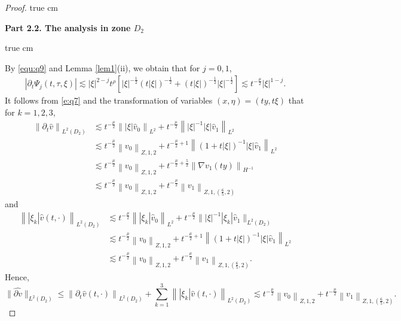 \documentclass[11pt,twoside]{article}
\newcommand{\p}{\partial}
\newcommand{\f}{\frac}
\theoremstyle{plain}
\theoremstyle{definition}
\theoremstyle{remark}
\numberwithin{equation}{section}
\begin{document}
\begin{proof}
 true cm

{\bf Part 2.2.  The analysis  in zone $D_2$}

 true cm

By  \eqref{equ:q9} and Lemma \ref{lem1}(ii), we obtain that for $j=0,1$,
\begin{equation}\label{e:q17}
\begin{aligned}
|\p_t\Psi_j(t,\tau,\xi)|
\lesssim |\xi|^{2-j} t^{\rho}\left[|\xi|^{-\f12}(t|\xi|)^{-\f12}+(t|\xi|)^{-\f12}|\xi|^{-\f12}\right]\lesssim t^{-\f{\mu}{2}}|\xi|^{1-j}.
\end{aligned}
\end{equation}
It follows from \eqref{e:q7} and the transformation of variables $(x, \eta)=(ty, t\xi)$  that for $k=1, 2, 3$,
\begin{equation}\label{e:q18}
\begin{aligned}
\left\|\p_t\hat{v}\right\|_{L^2(D_2)} & \lesssim  t^{-\f{\mu}{2}}\left\||\xi|\hat{v}_{0}\right\|_{L^{2}}+t^{-\f{\mu}{2}}\left\||\xi|^{-1}|\xi|\hat{v}_{1}\right\|_{L^{2}} \\
& \lesssim  t^{-\f{\mu}{2}}\left\|v_{0}\right\|_{Z, 1, 2}+t^{-\f{\mu}{2}+1}\left\|(1+t|\xi|)^{-1}|\xi|\hat{v}_{1}\right\|_{L^{2}} \\
& \lesssim  t^{-\f{\mu}{2}}\left\|v_{0}\right\|_{Z, 1, 2}+t^{-\f{\mu}{2}+\f52}\left\|\nabla v_{1}(ty)\right\|_{H^{-1}} \\
& \lesssim  t^{-\f{\mu}{2}}\left\|v_{0}\right\|_{Z, 1, 2}+t^{-\f{\mu}{2}}\left\| v_{1}\right\|_{Z, 1, (\f65, 2)}
\end{aligned}
\end{equation}
and
\begin{equation}\label{e:q19}
\begin{aligned}
\left\||\xi_k|\hat{v}(t, \cdot)\right\|_{L^2(D_2)}&\lesssim t^{-\frac{\mu}{2}}\left\||\xi_k|\hat{v}_{0}\right\|_{L^{2}}+t^{-\f{\mu}{2}} \||\xi|^{-1}|\xi_k|\hat{v}_{1}\|_{L^{2}(D_2)}\\
& \lesssim  t^{-\f{\mu}{2}}\left\|v_{0}\right\|_{Z, 1, 2}+t^{-\f{\mu}{2}+1}\left\|(1+t|\xi|)^{-1}|\xi|\hat{v}_{1}\right\|_{L^{2}} \\
& \lesssim  t^{-\f{\mu}{2}}\left\|v_{0}\right\|_{Z, 1, 2}+t^{-\f{\mu}{2}}\left\| v_{1}\right\|_{Z, 1, (\f65, 2)}.
\end{aligned}
\end{equation}
Hence,
\begin{equation}\label{e:q20}
\|\widehat{\p v}\|_{L^2(D_2)} \leq \left\|\p_t\hat{v}(t, \cdot)\right\|_{L^2(D_2)}+\sum_{k=1}^{3}\left\||\xi_k|\hat{v}(t, \cdot)\right\|_{L^2(D_2)}\lesssim  t^{-\f{\mu}{2}}\left\|v_{0}\right\|_{Z, 1, 2}+t^{-\f{\mu}{2}}\left\| v_{1}\right\|_{Z, 1, (\f65, 2)}.
\end{equation}


\end{proof}
\end{document}
